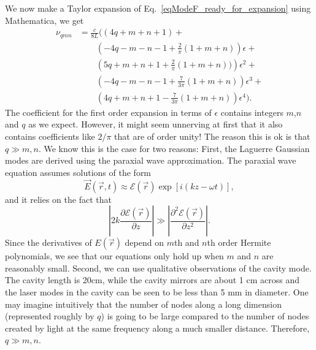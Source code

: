 We now make a Taylor expansion of Eq.\ \ref{eqModeF_ready_for_expansion} using Mathematica, we get 
\begin{align*}
\nu_{qmn}&=\frac{c}{8L}\biggl((4q+m+n+1) +\\
& \quad \quad \left(-4q-m-n-1+\frac{2}{\pi}(1+m+n)\right)\epsilon+\\
& \quad \quad \left(5q+m+n+1+\frac{2}{\pi}(1+m+n))\right)\epsilon^2+\\
& \quad \quad \left(-4q-m-n-1+\frac{7}{3\pi}(1+m+n)\right)\epsilon^3+\\
& \quad \quad \left(4q+m+n+1-\frac{7}{3\pi}(1+m+n)\right)\epsilon^4
\biggr).
\end{align*}
The coefficient for the first order expansion in terms of $\epsilon$ contains integers $m$,$n$ and $q$ as we expect. 
However, it might seem unnerving at first that it also contains coefficients like $2/\pi$ that are of order unity! The reason this is ok is that $q\gg m,n$. We know this is the case for two reasons: First, the Laguerre Gaussian modes are derived using the paraxial wave approximation. The paraxial wave equation assumes solutions of the form
\begin{equation}
\vec{E}(\vec{r},t)\approx \mathcal{E}(\vec{r})\exp[i(kz-\omega t)],
\end{equation}
and it relies on the fact that 
\begin{equation}
\left|2k\frac{\partial \mathcal{E}(\vec{r})}{\partial z}\right|\gg\left|\frac{\partial^2\mathcal{E}(\vec{r})}{\partial z^2}\right|.
\end{equation}
Since the derivatives of $E(\vec{r})$ depend on $m$th and $n$th order Hermite polynomials, we see that our equations only hold up when $m$ and $n$ are reasonably small. 
Second, we can use qualitative observations of the cavity mode. The cavity length is 20cm, while the cavity mirrors are about 1 cm across and the laser modes in the cavity can be seen to be less than 5 mm in diameter. One may imagine intuitively that the number of nodes along a long dimension (represented roughly by $q$) is going to be large compared to the number of nodes created by light at the same frequency along a much smaller distance. Therefore, $q\gg m,n$.


